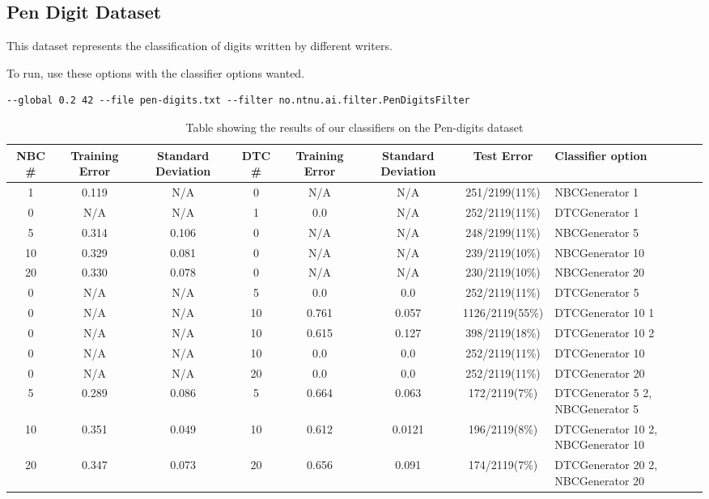 \subsection{Pen Digit Dataset}\label{pen digit dataset}
This dataset represents the classification of digits written by different writers.

To run, use these options with the classifier options wanted.

\begin{lstlisting}[label=lst:pen, caption=Pen digit dataset general options]
--global 0.2 42 --file pen-digits.txt --filter no.ntnu.ai.filter.PenDigitsFilter
\end{lstlisting}

\begin{landscape}
\begin{table}
\begin{tabular}{|c|c|c||c|c|c||c||p{5cm}|}
\hline
NBC \# & Training Error & Standard Deviation & DTC \# & Training Error
& Standard Deviation & Test Error & Classifier option \\ \hline
1 & 0.119 & N/A & 0 & N/A & N/A & 251/2199(11\%) & NBCGenerator 1 \\ \hline
0 & N/A & N/A & 1 & 0.0 & N/A & 252/2119(11\%) & DTCGenerator 1 \\ \hline
5 & 0.314 & 0.106 & 0 & N/A & N/A & 248/2199(11\%) & NBCGenerator 5 \\ \hline
10 & 0.329 & 0.081 & 0 & N/A & N/A & 239/2119(10\%) & NBCGenerator 10 \\ \hline
20 & 0.330 & 0.078 & 0 & N/A & N/A & 230/2119(10\%) & NBCGenerator 20 \\ \hline
0 & N/A & N/A & 5 & 0.0 & 0.0 & 252/2119(11\%) & DTCGenerator 5 \\ \hline
0 & N/A & N/A & 10 & 0.761 & 0.057 & 1126/2119(55\%) & DTCGenerator 10 1 \\ \hline
0 & N/A & N/A & 10 & 0.615 & 0.127 & 398/2119(18\%) & DTCGenerator 10 2 \\ \hline
0 & N/A & N/A & 10 & 0.0 & 0.0 & 252/2119(11\%) & DTCGenerator 10 \\ \hline
0 & N/A & N/A & 20 & 0.0 & 0.0 & 252/2119(11\%)& DTCGenerator 20 \\ \hline
5 & 0.289 & 0.086 & 5 & 0.664 & 0.063 & 172/2119(7\%) & DTCGenerator 5 2, 
\newline NBCGenerator 5 \\ \hline
10 & 0.351 & 0.049 & 10 & 0.612 & 0.0121 & 196/2119(8\%) & DTCGenerator 10 2, 
\newline NBCGenerator 10 \\ \hline
20 & 0.347 & 0.073 & 20 & 0.656 & 0.091 & 174/2119(7\%) & DTCGenerator 20 2, 
\newline NBCGenerator 20 \\ \hline
\hline
\end{tabular}
\label{tab:pen}
\caption[Pen-digits dataset boosting]{Table showing the results of our 
classifiers on the Pen-digits dataset}
\end{table}
\end{landscape}

